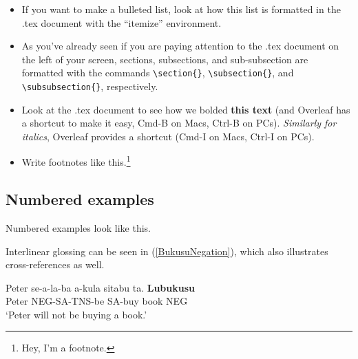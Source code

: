 \documentclass{article}
\begin{document}
\begin{itemize}

\item If you want to make a bulleted list, look at how this list is formatted in the .tex document with the ``itemize'' environment.

\item As you've already seen if you are paying attention to the .tex document on the left of your screen, sections, subsections, and sub-subsection are formatted with the commands \verb|\section{}|, \verb|\subsection{}|, and \verb|\subsubsection{}|, respectively.

\item Look at the .tex document to see how we bolded \textbf{this text} (and Overleaf has a shortcut to make it easy, Cmd-B on Macs, Ctrl-B on PCs). \textit{Similarly for italics}, Overleaf provides a shortcut (Cmd-I on Macs, Ctrl-I on PCs).

\item Write footnotes like this.\footnote{Hey, I'm a footnote.}

\end{itemize}

\subsection{Numbered examples}

\ea 
Numbered examples look like this.
\z 

\noindent Interlinear glossing can be seen in (\ref{BukusuNegation}), which also illustrates cross-references as well.

\ea \label{BukusuNegation}
\gll Peter se-a-la-ba a-kula sitabu ta. \hspace{2 in}  \textbf{Lubukusu} \\
Peter NEG-SA-TNS-be SA-buy book NEG \\
\glt `Peter will not be buying a book.'
\z

\end{document}
